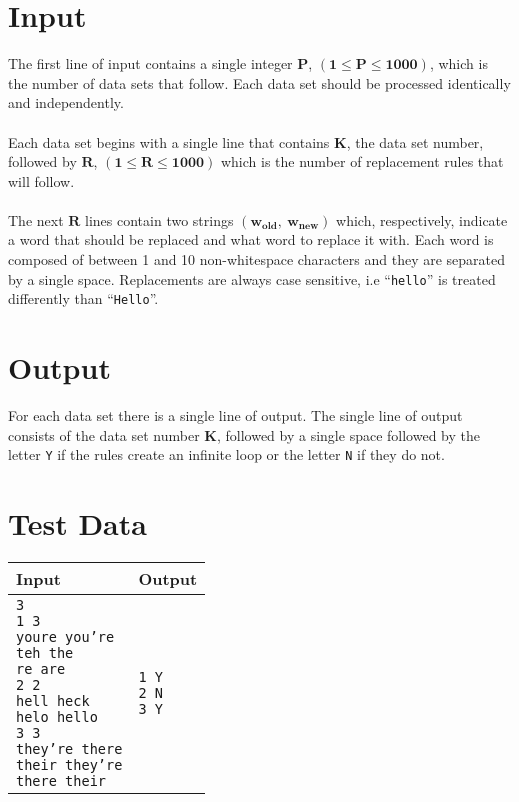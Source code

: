 \documentclass[11pt]{article}
\begin{document}
\section{Input}
The first line of input contains a single integer $\boldsymbol{P}$,
$(\boldsymbol{1} \le \boldsymbol{P} \le \boldsymbol{1000})$, which is the
number of data sets that follow. Each data set should be processed identically
and independently.
\\\\
Each data set begins with a single line that contains $\boldsymbol{K}$, the data
set number, followed by $\boldsymbol{R}$,
$(\boldsymbol{1} \le \boldsymbol{R} \le \boldsymbol{1000})$ which is the number
of replacement rules that will follow.
\\\\
The next $\boldsymbol{R}$ lines contain two strings $(\boldsymbol{w_\text{old},\ w_\text{new}})$
which, respectively, indicate a word that should be replaced and what word to replace it with.
Each word is composed of between 1 and 10 non-whitespace characters and they are separated
by a single space. Replacements are always case sensitive, i.e ``\texttt{hello}'' is treated
differently than ``\texttt{Hello}''.

\section{Output}
For each data set there is a single line of output. The single line of output
consists of the data set number $\boldsymbol{K}$, followed by a single space
followed by the letter \texttt{Y} if the rules create an infinite loop or the
letter \texttt{N} if they do not.

\section{Test Data}
\begin{tabularx}{\textwidth}{|X|X|}
	\hline
	Input & Output \\ \hline
	\parbox[t]{5cm}{
	\texttt{3\\
			1 3\\
			youre you're\\
			teh the\\
			re are\\
			2 2\\
			hell heck\\
			helo hello\\
			3 3\\
			they're there\\
			their they're\\
			there their\\
	}} &
	\parbox[t]{5cm}{
	\texttt{1 Y\\
			2 N\\
			3 Y\\
	}}\\
	\hline
\end{tabularx}
\end{document}
